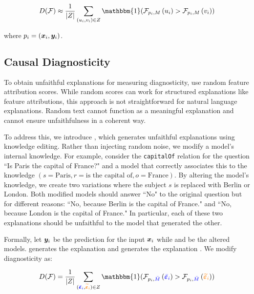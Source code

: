 \begin{equation}
D(\mathcal{F}) \approx \frac{1}{|Z|} \sum_{(u_i, v_i) \in Z} 
\mathbbm{1} (\mathcal{F}_{p_i, M}\left(u_i \right) > \mathcal{F}_{ p_i, M}\left(v_i\right))
\end{equation}

where $p_i = ({\bm{x}}_i, {\bm{y}}_i)$.

\subsection{Causal Diagnosticity}
\label{subsec:method}
To obtain unfaithful explanations for measuring diagnosticity, \citet{Chan2022ACS} 
use random feature attribution scores. While random scores can work for structured explanations like feature attributions,
this approach is not straightforward for natural language explanations. Random text cannot function as a meaningful explanation and cannot ensure unfaithfulness in a coherent way.

To address this, we introduce \methodname, which generates unfaithful explanations using knowledge editing. Rather than injecting random noise, we modify a model’s internal knowledge. For example, consider the \texttt{capitalOf} relation for the question ``Is Paris the capital of France?" and a model that correctly associates this to the knowledge $(s = \text{Paris}, r = \text{is the capital of}, o = \text{France})$. By altering the model's knowledge, we create two variations where the subject $s$ is replaced with Berlin or London. Both modified models should answer ``No" to the original question but for different reasons: ``No, because Berlin is the capital of France." and ``No, because London is the capital of France." In particular, each of these two explanations should be unfaithful to the model that generated the other. 

Formally, let ${\bm{y}}_i$ be the prediction for the input ${\bm{x}}_i$ while \BModel{} and \OModel{} be the altered models. \BModel{} generates the explanation  and \OModel{} generates the explanation . We modify diagnosticity as:

\begin{equation}
\label{eq:causal_diagnosticity}
D(\mathcal{F}) = \frac{1}{|Z|} \sum_{(\bepsilon{i}, \oepsilon{i}) \in Z} 
\mathbbm{1} (\mathcal{F}_{p_i, \BModel{}}\left(\bepsilon{i}\right) > \mathcal{F}_{p_i, \BModel}\left(\oepsilon{i}\right))
\end{equation}

